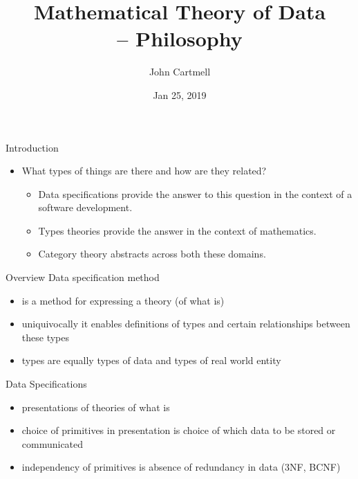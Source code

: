 \documentclass[xcolor=pst,dvips]{beamer}   %
\title[John Cartmell]{Mathematical Theory of Data \\ -- Philosophy}
\author{John Cartmell}
\institute{Ad Otium}
\date{Jan 25, 2019}
\begin{document}
\begin{frame}
\titlepage
\end{frame}


\begin{frame}{Introduction}
\begin{itemize}
\item
What types of things are there and how are they related? 
\begin{itemize}
\pause \item Data specifications provide the answer to this question in the context of a software development. 
\pause \item Types theories provide the answer in the context of mathematics. 
\pause \item Category theory abstracts across both these domains.
\end{itemize}
\end{itemize}
\end{frame}

\begin{frame}{Overview}
Data specification method 
\begin{itemize}
\item is a method for expressing a  theory (of what is)
\item uniquivocally it enables definitions of types and certain relationships between these types
\item types are equally types of data and types of real world entity
\end{itemize}
\end{frame}

\begin{frame}{Data Specifications}
\begin{itemize}
\item presentations of theories of what is
\item choice of primitives in presentation is choice of which data to be stored or communicated
\item independency of primitives is absence of redundancy in data (3NF, BCNF)
\end{itemize}
\end{frame}
\end{document}
